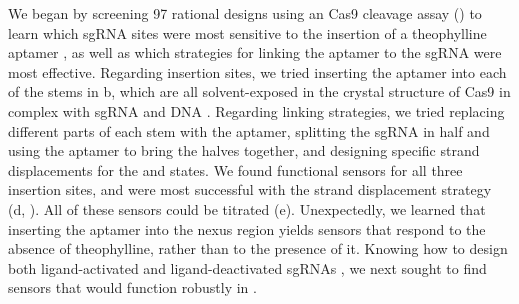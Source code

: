 \documentclass[10pt,oneside]{article}
\begin{document}

We began by screening 97 rational designs using an \invitro{} Cas9 cleavage assay () to learn which sgRNA sites were most sensitive to the insertion of a theophylline aptamer \autocite{jenison1994}, as well as which strategies for linking the aptamer to the sgRNA were most effective.  Regarding insertion sites, we tried inserting the aptamer into each of the stems in b, which are all solvent-exposed in the crystal structure of Cas9 in complex with sgRNA and DNA \autocite{nishimasu2014}.  Regarding linking strategies, we tried replacing different parts of each stem with the aptamer, splitting the sgRNA in half and using the aptamer to bring the halves together, and designing specific strand displacements for the \apo{} and \holo{} states.  We found functional sensors for all three insertion sites, and were most successful with the strand displacement strategy (d, ).  All of these sensors could be titrated (e).  Unexpectedly, we learned that inserting the aptamer into the nexus region yields sensors that respond to the absence of theophylline, rather than to the presence of it.  Knowing how to design both ligand-activated and ligand-deactivated sgRNAs \invitro{}, we next sought to find sensors that would function robustly in \ecoli{}.
% 
% 
% 
% 
% 
% 
% 
% 

\end{document}
